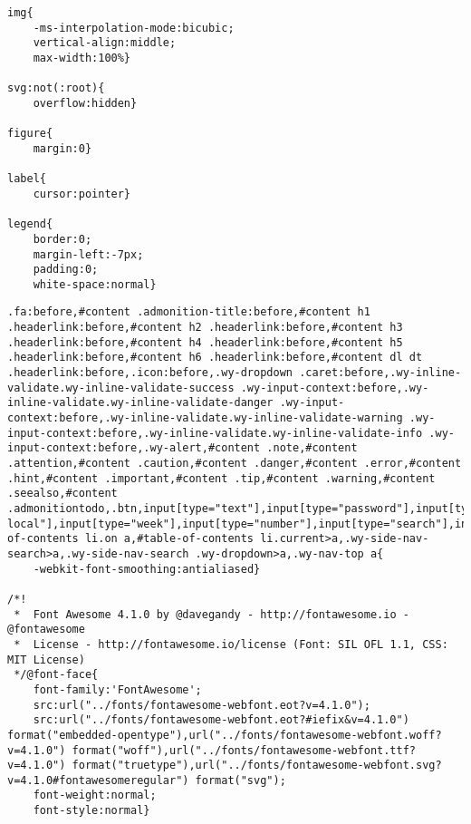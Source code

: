 \documentclass[11pt]{article}
\begin{document}
\begin{verbatim}
img{
    -ms-interpolation-mode:bicubic;
    vertical-align:middle;
    max-width:100%}

svg:not(:root){
    overflow:hidden}

figure{
    margin:0}

label{
    cursor:pointer}

legend{
    border:0;
    margin-left:-7px;
    padding:0;
    white-space:normal}
\end{verbatim}

\begin{verbatim}
.fa:before,#content .admonition-title:before,#content h1 .headerlink:before,#content h2 .headerlink:before,#content h3 .headerlink:before,#content h4 .headerlink:before,#content h5 .headerlink:before,#content h6 .headerlink:before,#content dl dt .headerlink:before,.icon:before,.wy-dropdown .caret:before,.wy-inline-validate.wy-inline-validate-success .wy-input-context:before,.wy-inline-validate.wy-inline-validate-danger .wy-input-context:before,.wy-inline-validate.wy-inline-validate-warning .wy-input-context:before,.wy-inline-validate.wy-inline-validate-info .wy-input-context:before,.wy-alert,#content .note,#content .attention,#content .caution,#content .danger,#content .error,#content .hint,#content .important,#content .tip,#content .warning,#content .seealso,#content .admonitiontodo,.btn,input[type="text"],input[type="password"],input[type="email"],input[type="url"],input[type="date"],input[type="month"],input[type="time"],input[type="datetime"],input[type="datetime-local"],input[type="week"],input[type="number"],input[type="search"],input[type="tel"],input[type="color"],select,textarea,#table-of-contents li.on a,#table-of-contents li.current>a,.wy-side-nav-search>a,.wy-side-nav-search .wy-dropdown>a,.wy-nav-top a{
    -webkit-font-smoothing:antialiased}

/*!
 *  Font Awesome 4.1.0 by @davegandy - http://fontawesome.io - @fontawesome
 *  License - http://fontawesome.io/license (Font: SIL OFL 1.1, CSS: MIT License)
 */@font-face{
    font-family:'FontAwesome';
    src:url("../fonts/fontawesome-webfont.eot?v=4.1.0");
    src:url("../fonts/fontawesome-webfont.eot?#iefix&v=4.1.0") format("embedded-opentype"),url("../fonts/fontawesome-webfont.woff?v=4.1.0") format("woff"),url("../fonts/fontawesome-webfont.ttf?v=4.1.0") format("truetype"),url("../fonts/fontawesome-webfont.svg?v=4.1.0#fontawesomeregular") format("svg");
    font-weight:normal;
    font-style:normal}


\end{verbatim}
\end{document}
